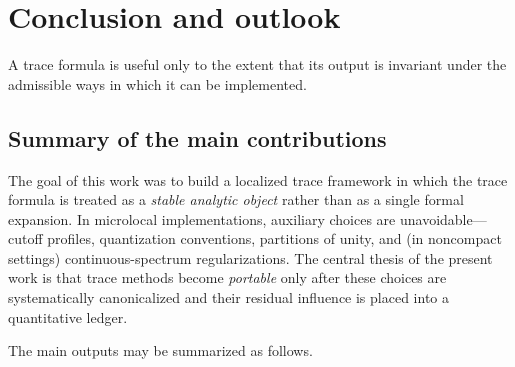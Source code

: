 %

\chapter{Conclusion and outlook}
\label{chap:11-conclusion}

\epigraph{A trace formula is useful only to the extent that its output is invariant under the admissible ways in which it can be implemented.}{}

\section{Summary of the main contributions}
\label{sec:11.summary}

The goal of this work was to build a localized trace framework in which the trace formula is treated as a \emph{stable
analytic object} rather than as a single formal expansion.  In microlocal implementations, auxiliary choices are
unavoidable---cutoff profiles, quantization conventions, partitions of unity, and (in noncompact settings) continuous-spectrum
regularizations.  The central thesis of the present work is that trace methods become \emph{portable} only after these
choices are systematically canonicalized and their residual influence is placed into a quantitative ledger.

The main outputs may be summarized as follows.


